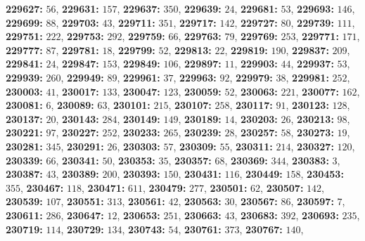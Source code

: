 \textsf{\bfseries 229627:} $56$, \textsf{\bfseries 229631:} $157$, \textsf{\bfseries 229637:} $350$, \textsf{\bfseries 229639:} $24$, \textsf{\bfseries 229681:} $53$, \textsf{\bfseries 229693:} $146$, \textsf{\bfseries 229699:} $88$, \textsf{\bfseries 229703:} $43$, \textsf{\bfseries 229711:} $351$, \textsf{\bfseries 229717:} $142$, \textsf{\bfseries 229727:} $80$, \textsf{\bfseries 229739:} $111$, \textsf{\bfseries 229751:} $222$, \textsf{\bfseries 229753:} $292$, \textsf{\bfseries 229759:} $66$, \textsf{\bfseries 229763:} $79$, \textsf{\bfseries 229769:} $253$, \textsf{\bfseries 229771:} $171$, \textsf{\bfseries 229777:} $87$, \textsf{\bfseries 229781:} $18$, \textsf{\bfseries 229799:} $52$, \textsf{\bfseries 229813:} $22$, \textsf{\bfseries 229819:} $190$, \textsf{\bfseries 229837:} $209$, \textsf{\bfseries 229841:} $24$, \textsf{\bfseries 229847:} $153$, \textsf{\bfseries 229849:} $106$, \textsf{\bfseries 229897:} $11$, \textsf{\bfseries 229903:} $44$, \textsf{\bfseries 229937:} $53$, \textsf{\bfseries 229939:} $260$, \textsf{\bfseries 229949:} $89$, \textsf{\bfseries 229961:} $37$, \textsf{\bfseries 229963:} $92$, \textsf{\bfseries 229979:} $38$, \textsf{\bfseries 229981:} $252$, \textsf{\bfseries 230003:} $41$, \textsf{\bfseries 230017:} $133$, \textsf{\bfseries 230047:} $123$, \textsf{\bfseries 230059:} $52$, \textsf{\bfseries 230063:} $221$, \textsf{\bfseries 230077:} $162$, \textsf{\bfseries 230081:} $6$, \textsf{\bfseries 230089:} $63$, \textsf{\bfseries 230101:} $215$, \textsf{\bfseries 230107:} $258$, \textsf{\bfseries 230117:} $91$, \textsf{\bfseries 230123:} $128$, \textsf{\bfseries 230137:} $20$, \textsf{\bfseries 230143:} $284$, \textsf{\bfseries 230149:} $149$, \textsf{\bfseries 230189:} $14$, \textsf{\bfseries 230203:} $26$, \textsf{\bfseries 230213:} $98$, \textsf{\bfseries 230221:} $97$, \textsf{\bfseries 230227:} $252$, \textsf{\bfseries 230233:} $265$, \textsf{\bfseries 230239:} $28$, \textsf{\bfseries 230257:} $58$, \textsf{\bfseries 230273:} $19$, \textsf{\bfseries 230281:} $345$, \textsf{\bfseries 230291:} $26$, \textsf{\bfseries 230303:} $57$, \textsf{\bfseries 230309:} $55$, \textsf{\bfseries 230311:} $214$, \textsf{\bfseries 230327:} $120$, \textsf{\bfseries 230339:} $66$, \textsf{\bfseries 230341:} $50$, \textsf{\bfseries 230353:} $35$, \textsf{\bfseries 230357:} $68$, \textsf{\bfseries 230369:} $344$, \textsf{\bfseries 230383:} $3$, \textsf{\bfseries 230387:} $43$, \textsf{\bfseries 230389:} $200$, \textsf{\bfseries 230393:} $150$, \textsf{\bfseries 230431:} $116$, \textsf{\bfseries 230449:} $158$, \textsf{\bfseries 230453:} $355$, \textsf{\bfseries 230467:} $118$, \textsf{\bfseries 230471:} $611$, \textsf{\bfseries 230479:} $277$, \textsf{\bfseries 230501:} $62$, \textsf{\bfseries 230507:} $142$, \textsf{\bfseries 230539:} $107$, \textsf{\bfseries 230551:} $313$, \textsf{\bfseries 230561:} $42$, \textsf{\bfseries 230563:} $30$, \textsf{\bfseries 230567:} $86$, \textsf{\bfseries 230597:} $7$, \textsf{\bfseries 230611:} $286$, \textsf{\bfseries 230647:} $12$, \textsf{\bfseries 230653:} $251$, \textsf{\bfseries 230663:} $43$, \textsf{\bfseries 230683:} $392$, \textsf{\bfseries 230693:} $235$, \textsf{\bfseries 230719:} $114$, \textsf{\bfseries 230729:} $134$, \textsf{\bfseries 230743:} $54$, \textsf{\bfseries 230761:} $373$, \textsf{\bfseries 230767:} $140$, 
